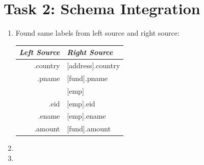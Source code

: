 \documentclass{scrartcl}
\begin{document}
	\section*{Task 2: Schema Integration}
	\begin{center}
	\end{center}
	\begin{enumerate}
		\item Found same labels from left source and right source:
		\begin{center}
			\begin{tabular}{|r|l|}
				\hline
				\textit{Left Source} & \textit{Right Source}\\
				\hline
				[dept].country & [address].country\\\relax
				[project].pname & [fund].pname\\\relax
				[emp] & [emp]\\\relax
				[emp].eid & [emp].eid\\\relax
				[emp].ename & [emp].ename\\\relax
				[grant].amount & [fund].amount\\
				\hline
			\end{tabular}
		\end{center}
		\item
		\item
	\end{enumerate}
	
\end{document}
